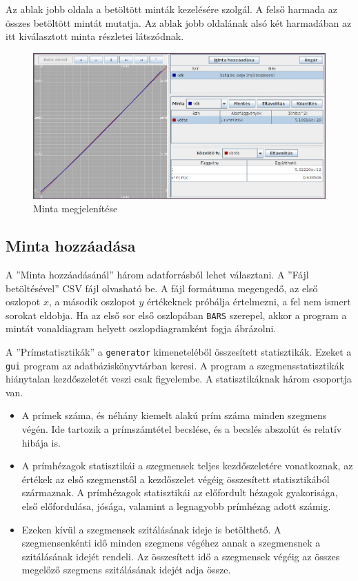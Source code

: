 Az ablak jobb oldala a betöltött minták kezelésére szolgál.
A felső harmada az összes betöltött mintát mutatja.
Az ablak jobb oldalának alsó két harmadában az itt kiválasztott minta részletei látszódnak.

\begin{figure}[h]
\caption{Minta megjelenítése}
\centering
\includegraphics[scale=0.5]{graph.png}
\end{figure}

\subsection{Minta hozzáadása}

A ''Minta hozzáadásánál'' három adatforrásból lehet választani.
A ''Fájl betöltésével'' CSV fájl olvasható be. A fájl formátuma megengedő, az első oszlopot $x$, a második oszlopot $y$ értékeknek próbálja értelmezni, a fel nem ismert sorokat eldobja.
Ha az első sor első oszlopában \texttt{BARS} szerepel, akkor a program a mintát vonaldiagram helyett oszlopdiagramként fogja ábrázolni.

A ''Prímstatisztikák'' a \texttt{generator} kimeneteléből összesített statisztikák. Ezeket a \texttt{gui} program az adatbáziskönyvtárban keresi.
A program a szegmensstatisztikák hiánytalan kezdőszeletét veszi csak figyelembe.
A statisztikáknak három csoportja van.
\begin{itemize}
\item A prímek száma, és néhány kiemelt alakú prím száma minden szegmens végén.
Ide tartozik a prímszámtétel becslése, és a becslés abszolút és relatív hibája is.

\item A prímhézagok statisztikái a szegmensek teljes kezdőszeletére vonatkoznak, az értékek az első szegmenstől a kezdőszelet végéig összesített statisztikából származnak.
A prímhézagok statisztikái az előfordult hézagok gyakorisága, első előfordulása, jósága, valamint a legnagyobb prímhézag adott számig.

\item Ezeken kívül a szegmensek szitálásának ideje is betölthető.
A szegmensenkénti idő minden szegmens végéhez annak a szegmensnek a szitálásának idejét rendeli.
Az összesített idő a szegmensek végéig az összes megelőző szegmens szitálásának idejét adja össze.
\end{itemize}

